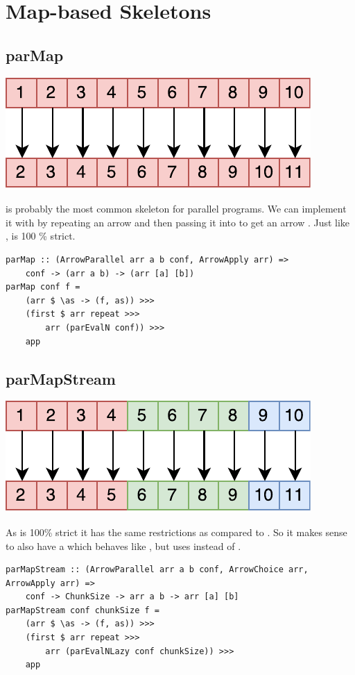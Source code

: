 \section{Map-based Skeletons}
\subsection{parMap}
\begin{center}
	\includegraphics[scale=0.7]{images/parMap}
\end{center}
 is probably the most common skeleton for parallel programs. We can implement it with  by repeating an arrow  and then passing it into  to get an arrow . 
Just like ,  is 100 \% strict.
\begin{lstlisting}[frame=htrbl]
parMap :: (ArrowParallel arr a b conf, ArrowApply arr) =>
	conf -> (arr a b) -> (arr [a] [b])
parMap conf f =
	(arr $ \as -> (f, as)) >>>
	(first $ arr repeat >>>
		arr (parEvalN conf)) >>>
	app
\end{lstlisting}

\subsection{parMapStream}
\begin{center}
	\includegraphics[scale=0.7]{images/parMapStream}
\end{center}
As  is 100\% strict it has the same restrictions as  compared to . So it makes sense to also have a  which behaves like , but uses  instead of .
\begin{lstlisting}[frame=htrbl]
parMapStream :: (ArrowParallel arr a b conf, ArrowChoice arr, ArrowApply arr) =>
	conf -> ChunkSize -> arr a b -> arr [a] [b]
parMapStream conf chunkSize f =
	(arr $ \as -> (f, as)) >>>
	(first $ arr repeat >>>
		arr (parEvalNLazy conf chunkSize)) >>>
	app
\end{lstlisting}

